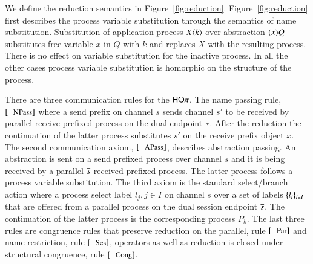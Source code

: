 We define the reduction semantics in Figure~\ref{fig:reduction}.
Figure~\ref{fig:reduction} first describes the process variable
substitution through the semantics
of name substitution. Substitution of application process $X\langle k \rangle$
over abstraction $(x)Q$ substitutes free variable
$x$ in $Q$ with $k$ and replaces $X$ with the resulting process.
There is no effect on variable substitution for the inactive process.
In all the other cases process variable substitution is homorphic 
on the structure of the process.



There are three communication rules for the $\mathsf{HO}\pi$. The name passing
rule, $\orule{NPass}$ where a send prefix on channel $s$ sends
channel $s'$ to be received by parallel receive prefixed process
on the dual endpoint $\overline{s}$. After the reduction the continuation of the 
latter process substitutes $s'$ on the receive prefix object $x$.
The second communication axiom, $\orule{APass}$, describes
abstraction passing. An abstraction is sent on a send prefixed process
over channel $s$ and it is being received by a parallel $\overline{s}$-received
prefixed process. The latter process follows a process variable
substitution.
The third axiom is the standard select/branch action where
a process select label $l_j, j \in I$ on channel $s$ over a set of
labels $\{l_i\}_{i \in I}$ that are offered from a parallel process
on the dual session endpoint $\overline{s}$. The continuation of the latter
process is the corresponding process $P_k$.
The last three rules are congruence rules that preserve reduction
on the parallel, rule $\orule{Par}$ and name restriction, rule $\orule{Ses}$,
operators as well as reduction is closed under structural congruence, rule $\orule{Cong}$.




